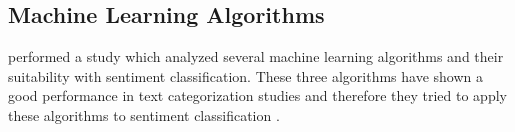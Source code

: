

\subsection{Machine Learning Algorithms}
\label{ss:background-optionmining-machinelearningalgorithms}

\citeauthor{Pang2002} performed a study which analyzed several machine learning algorithms and their suitability with sentiment classification.
These three algorithms have shown a good performance in text categorization studies and therefore they tried to apply these algorithms to sentiment classification \cite{Pang2002}.

